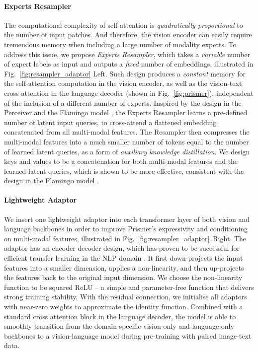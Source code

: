 \documentclass[11pt]{article}
\begin{document}
{\paragraph{Experts Resampler} The computational complexity of self-attention is {\it quadratically proportional} to the number of input patches.  And therefore, the vision encoder can easily require tremendous memory when including a large number of modality experts. To address this issue, we propose {\it Experts Resampler}, which takes a {\it variable} number of expert labels as input and outputs a {\it fixed} number of embeddings, illustrated in Fig.~\ref{fig:resampler_adaptor} Left. Such design produces a {\it constant} memory for the self-attention computation in the vision encoder, as well as the vision-text cross attention in the language decoder (shown in Fig.~\ref{fig:prismer}), independent of the inclusion of a different number of experts. Inspired by the design in the Perceiver \cite{jaegle2021perceiver} and the Flamingo model \cite{alayrac2022flamingo}, the Experts Resampler learns a pre-defined number of latent input queries, to cross-attend a flattened embedding concatenated from all multi-modal features. The Resampler then compresses the multi-modal features into a much smaller number of tokens equal to the number of learned latent queries, as a form of {\it auxiliary knowledge distillation}. We design keys and values to be a concatenation for both multi-modal features and the learned latent queries, which is shown to be more effective, consistent with the design in the Flamingo model \cite{alayrac2022flamingo}.


\paragraph{Lightweight Adaptor} We insert one lightweight adaptor into each transformer layer of both vision and language backbones in order to improve Prismer's expressivity and conditioning on multi-modal features, illustrated in Fig.~\ref{fig:resampler_adaptor}~Right. The adaptor has an encoder-decoder design, which has proven to be successful for efficient transfer learning in the NLP domain \cite{houlsby2019parameter,pfeiffer2020adapterhub}. It first down-projects the input features into a smaller dimension, applies a non-linearity, and then up-projects the features back to the original input dimension. We choose the non-linearity function to be squared ReLU  \cite{so2021primer} -- a simple and parameter-free function that delivers strong training stability. With the residual connection, we initialise all adaptors with near-zero weights to approximate the identity function. Combined with a standard cross attention block in the language decoder, the model is able to smoothly transition from the domain-specific vision-only and language-only backbones to a vision-language model during pre-training with paired image-text data.

}
\end{document}
